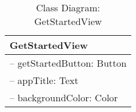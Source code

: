 \begin{table}[H]
\centering
\caption{Class Diagram: GetStartedView}

\hspace{1em}
\renewcommand{\arraystretch}{1.7}

\begin{tabular}{|l|}
\hline
\textbf{GetStartedView} \\
\hline
– getStartedButton: Button \\
– appTitle: Text \\
– backgroundColor: Color \\
\hline
\end{tabular}
\end{table}
